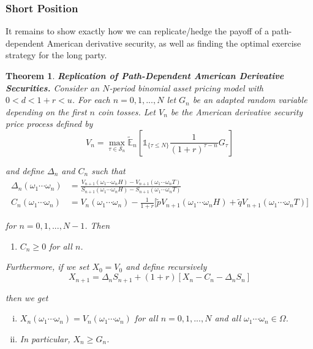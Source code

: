 \documentclass[12pt]{article}
\newtheorem{theorem}{Theorem}
\newlength\tindent
\renewcommand{\indent}{\hspace*{\tindent}}
\newcommand{\E}{\mathbb E}
\newcounter{mycounter}
\begin{document}
\subsubsection{Short Position}
	
\indent It remains to show exactly how we can replicate/hedge the payoff of a path-dependent American derivative security, as well as finding the optimal exercise strategy for the long party.
	
\begin{theorem} {\bf Replication of Path-Dependent American Derivative Securities.} Consider an $N$-period binomial asset pricing model with $0 < d < 1 + r < u$. For each $n = 0,1,..., N$ let $G_n$ be an adapted random variable depending on the first $n$ coin tosses. Let $V_n$ be the American derivative security price process defined by
\begin{equation*}
	V_n = \max_{\tau \in \mathcal S_n} \tilde{\E}_n \left[ \mathds 1_{\{\tau \leq N\}} \frac{1}{(1 + r)^{\tau - n}} G_\tau \right]
\end{equation*}

and define $\Delta_n$ and $C_n$ such that
\begin{align*}
	\Delta_n(\omega_1\cdots\omega_n) &= \frac{ V_{n + 1}(\omega_1\cdots\omega_nH) - V_{n + 1}(\omega_1\cdots\omega_nT) }{ S_{n + 1}(\omega_1\cdots\omega_nH) - S_{n + 1}(\omega_1\cdots\omega_nT) }\\
	C_n(\omega_1\cdots\omega_n) &= V_n(\omega_1\cdots\omega_n) - \frac{1}{1 + r}\Big[ \tilde{p}V_{n + 1}(\omega_1\cdots\omega_nH) + \tilde{q}V_{n + 1}(\omega_1\cdots\omega_nT) \Big]
\end{align*}

for $n = 0,1,..., N - 1$. Then
\begin{enumerate}
	\item $C_n \geq 0$ for all $n$.
	\setcounter{mycounter}{\theenumi}
\end{enumerate}

Furthermore, if we set $X_0 = V_0$ and define recursively 
\begin{equation*}
	X_{n + 1} = \Delta_nS_{n + 1} + (1 + r)[X_n - C_n - \Delta_nS_n]
\end{equation*}

then we get
\begin{enumerate}[(i)]
	\setcounter{enumi}{\themycounter}
	\item $X_n(\omega_1\cdots\omega_n) = V_n(\omega_1\cdots\omega_n)$ for all $n = 0,1,...,N$ and all $\omega_1\cdots\omega_n\in\Omega$.
	\item In particular, $X_n \geq G_n$.
\end{enumerate} \hfill\\


\end{theorem}
\end{document}
